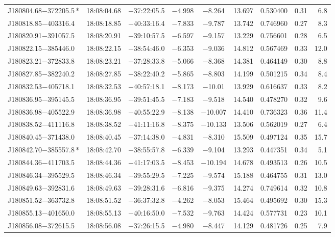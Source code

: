 \begin{table*}
\begin{tabular}{lcccccccr}
J180804.68$-$372205.5\,* & 18:08:04.68 & $-$37:22:05.5 & $-$4.998 & $-$8.264 & 13.697 & 0.530400 & 0.31 & 6.8 \\
J180818.85$-$403316.4 & 18:08:18.85 & $-$40:33:16.4 & $-$7.833 & $-$9.787 & 13.742 & 0.746960 & 0.27 & 8.3 \\
J180820.91$-$391057.5 & 18:08:20.91 & $-$39:10:57.5 & $-$6.597 & $-$9.157 & 13.229 & 0.756601 & 0.28 & 6.5 \\
J180822.15$-$385446.0 & 18:08:22.15 & $-$38:54:46.0 & $-$6.353 & $-$9.036 & 14.812 & 0.567469 & 0.33 & 12.0 \\
J180823.21$-$372833.8 & 18:08:23.21 & $-$37:28:33.8 & $-$5.066 & $-$8.368 & 14.381 & 0.464149 & 0.30 & 8.8 \\
J180827.85$-$382240.2 & 18:08:27.85 & $-$38:22:40.2 & $-$5.865 & $-$8.803 & 14.199 & 0.501215 & 0.34 & 8.4 \\
J180832.53$-$405718.1 & 18:08:32.53 & $-$40:57:18.1 & $-$8.173 & $-$10.01 & 13.929 & 0.616637 & 0.33 & 8.2 \\
J180836.95$-$395145.5 & 18:08:36.95 & $-$39:51:45.5 & $-$7.183 & $-$9.518 & 14.540 & 0.478270 & 0.32 & 9.6 \\
J180836.98$-$405522.9 & 18:08:36.98 & $-$40:55:22.9 & $-$8.138 & $-$10.007 & 14.410 & 0.736323 & 0.36 & 11.4 \\
J180838.52$-$411116.8 & 18:08:38.52 & $-$41:11:16.8 & $-$8.375 & $-$10.133 & 13.506 & 0.562019 & 0.27 & 6.4 \\
J180840.45$-$371438.0 & 18:08:40.45 & $-$37:14:38.0 & $-$4.831 & $-$8.310 & 15.509 & 0.497124 & 0.35 & 15.7 \\
J180842.70$-$385557.8\,* & 18:08:42.70 & $-$38:55:57.8 & $-$6.339 & $-$9.104 & 13.293 & 0.447351 & 0.34 & 5.1 \\
J180844.36$-$411703.5 & 18:08:44.36 & $-$41:17:03.5 & $-$8.453 & $-$10.194 & 14.678 & 0.493513 & 0.26 & 10.5 \\
J180846.34$-$395529.5 & 18:08:46.34 & $-$39:55:29.5 & $-$7.225 & $-$9.574 & 15.188 & 0.464755 & 0.31 & 13.0 \\
J180849.63$-$392831.6 & 18:08:49.63 & $-$39:28:31.6 & $-$6.816 & $-$9.375 & 14.274 & 0.749614 & 0.32 & 10.8 \\
J180851.52$-$363732.8 & 18:08:51.52 & $-$36:37:32.8 & $-$4.262 & $-$8.053 & 15.464 & 0.495692 & 0.30 & 15.3 \\
J180855.13$-$401650.0 & 18:08:55.13 & $-$40:16:50.0 & $-$7.532 & $-$9.763 & 14.424 & 0.577731 & 0.23 & 10.1 \\
J180856.08$-$372615.5 & 18:08:56.08 & $-$37:26:15.5 & $-$4.980 & $-$8.447 & 14.129 & 0.481726 & 0.25 & 7.9 \\

\end{tabular}
\end{table*}
